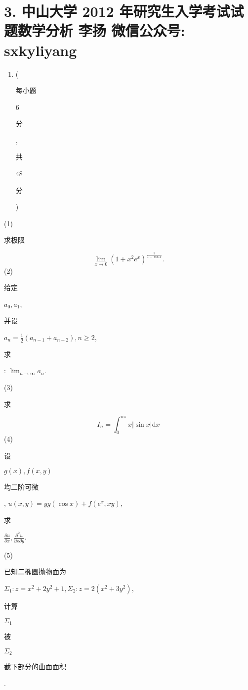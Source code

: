 \documentclass[10pt]{article}
\begin{document}
\section{3. 中山大学 2012 年研究生入学考试试题数学分析 
 李扬 
 微信公众号: sxkyliyang}
\begin{enumerate}
  \item (\begin{CJK}{UTF8}{mj}每小题\end{CJK} 6 \begin{CJK}{UTF8}{mj}分\end{CJK}, \begin{CJK}{UTF8}{mj}共\end{CJK} 48 \begin{CJK}{UTF8}{mj}分\end{CJK})
\end{enumerate}
(1) \begin{CJK}{UTF8}{mj}求极限\end{CJK}
$$
\lim _{x \rightarrow 0}\left(1+x^{2} e^{x}\right)^{\frac{1}{1-\cos x}} .
$$
(2) \begin{CJK}{UTF8}{mj}给定\end{CJK} $a_{0}, a_{1}$, \begin{CJK}{UTF8}{mj}并设\end{CJK} $a_{n}=\frac{1}{2}\left(a_{n-1}+a_{n-2}\right), n \geq 2$, \begin{CJK}{UTF8}{mj}求\end{CJK}: $\lim _{n \rightarrow \infty} a_{n}$.

(3) \begin{CJK}{UTF8}{mj}求\end{CJK}
$$
I_{n}=\int_{0}^{n \pi} x|\sin x| \mathrm{d} x
$$
(4) \begin{CJK}{UTF8}{mj}设\end{CJK} $g(x), f(x, y)$ \begin{CJK}{UTF8}{mj}均二阶可微\end{CJK}, $u(x, y)=y g(\cos x)+f\left(e^{x}, x y\right)$, \begin{CJK}{UTF8}{mj}求\end{CJK} $\frac{\partial u}{\partial x}, \frac{\partial^{2} u}{\partial x \partial y}$.

(5) \begin{CJK}{UTF8}{mj}已知二椭圆抛物面为\end{CJK} $\Sigma_{1}: z=x^{2}+2 y^{2}+1, \Sigma_{2}: z=2\left(x^{2}+3 y^{2}\right)$, \begin{CJK}{UTF8}{mj}计算\end{CJK} $\Sigma_{1}$ \begin{CJK}{UTF8}{mj}被\end{CJK} $\Sigma_{2}$ \begin{CJK}{UTF8}{mj}截下部分的曲面面积\end{CJK}.
\end{document}
